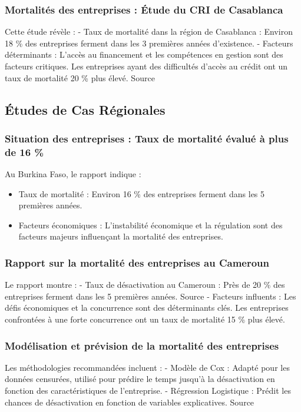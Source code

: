 \documentclass[a4paper,12pt]{report}
\begin{document}
\subsubsection{Mortalités des entreprises : Étude du CRI de Casablanca}
Cette étude révèle : - Taux de mortalité dans la région de Casablanca : Environ 18 \% des entreprises ferment dans les 3 premières années d’existence. - Facteurs déterminants : L’accès au financement et les compétences en gestion sont des facteurs critiques. Les entreprises ayant des difficultés d’accès au crédit ont un taux de mortalité 20 \% plus élevé. Source
\subsection{Études de Cas Régionales}
\subsubsection{Situation des entreprises : Taux de mortalité évalué à plus de 16 \%} 
Au Burkina Faso, le rapport indique :
\begin{itemize}[label=\textbullet]
\item Taux de mortalité : Environ 16 \% des entreprises ferment dans les 5 premières années. 
\item Facteurs économiques : L’instabilité économique et la régulation sont des facteurs majeurs influençant la mortalité des entreprises.
\end{itemize}

\subsubsection{Rapport sur la mortalité des entreprises au Cameroun}
Le rapport montre : - Taux de désactivation au Cameroun : Près de 20 \% des entreprises ferment dans les 5 premières années. Source - Facteurs influents : Les défis économiques et la concurrence sont des déterminants clés. Les entreprises confrontées à une forte concurrence ont un taux de mortalité 15 \% plus élevé.
\subsubsection{Modélisation et prévision de la mortalité des entreprises}
Les méthodologies recommandées incluent : - Modèle de Cox : Adapté pour les données censurées, utilisé pour prédire le temps jusqu’à la désactivation en fonction des caractéristiques de l’entreprise. - Régression Logistique : Prédit les chances de désactivation en fonction de variables explicatives. Source
\end{document}

